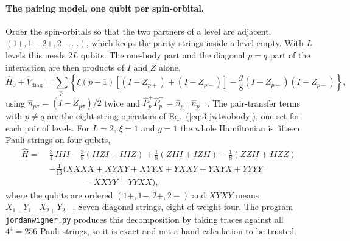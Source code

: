 \paragraph{The pairing model, one qubit per spin-orbital.}
Order the spin-orbitals so that the two partners of a level are adjacent,
$(1+,1-,2+,2-,\dots)$, which keeps the parity strings inside a level empty.
With $L$ levels this needs $2L$ qubits.  The one-body part and the diagonal
$p=q$ part of the interaction are then products of $I$ and $Z$ alone,
\begin{equation}
  \hat{H}_0 + \hat{V}_{\mathrm{diag}}
   = \sum_{p}\left\{
     \xi(p-1)\left[\left(I-Z_{p+}\right)+\left(I-Z_{p-}\right)\right]
     - \frac{g}{8}\left(I-Z_{p+}\right)\left(I-Z_{p-}\right)
     \right\},
  \label{eq:4-jwpairingdiag}
\end{equation}
using $\hat{n}_{p\sigma}=(I-Z_{p\sigma})/2$ twice and
$\hat{P}^{+}_p\hat{P}^{-}_p=\hat{n}_{p+}\hat{n}_{p-}$.  The pair-transfer
terms with $p\ne q$ are the eight-string operators of
Eq.~(\ref{eq:3-jwtwobody}), one set for each pair of levels.  For $L=2$,
$\xi=1$ and $g=1$ the whole Hamiltonian is fifteen Pauli strings on four
qubits,
\begin{align}
  \hat{H}
   =\;& \tfrac{3}{4}\,IIII
     - \tfrac{3}{8}\left(IIZI+IIIZ\right)
     + \tfrac18\left(ZIII+IZII\right)
     - \tfrac18\left(ZZII+IIZZ\right)\nonumber\\
     & - \tfrac{1}{16}\Big(
         XXXX + XYXY + XYYX + YXXY + YXYX + YYYY\nonumber\\
     & \qquad\qquad - XXYY - YYXX
       \Big),
  \label{eq:4-jwpairingfull}
\end{align}
where the qubits are ordered $(1+,1-,2+,2-)$ and $XYXY$ means
$X_{1+}Y_{1-}X_{2+}Y_{2-}$.  Seven diagonal strings, eight of weight four.
The program \texttt{jordanwigner.py} produces this decomposition by taking
traces against all $4^4=256$ Pauli strings, so it is exact and not a
hand calculation to be trusted.

